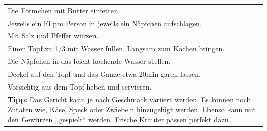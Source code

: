 \begin{tabular}{p{15cm}}
	\\
  Die Förmchen mit Butter einfetten.\\
  Jeweils ein Ei pro Person in jeweils ein Näpfchen aufschlagen. \\
  Mit Salz und Pfeffer würzen.\\
  Einen Topf zu 1/3 mit Wasser füllen. Langsam zum Kochen bringen.\\
  Die Näpfchen in das leicht kochende Wasser stellen.\\
  Deckel auf den Topf und das Ganze etwa 20min garen lassen.\\
  Vorsichtig aus dem Topf heben und servieren.\\
  \textbf{Tipp:} Das Gericht kann je nach Geschmack variiert werden. Es können noch Zutaten wie, Käse, Speck oder Zwiebeln hinzugefügt werden. Ebenso kann mit den Gewürzen „gespielt“ werden. Frische Kräuter passen perfekt dazu.
\end{tabular}
